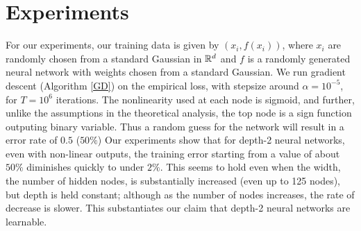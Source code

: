 

\section{Experiments}
\label{experiments}
For our experiments, our training data is given by $(x_i, f(x_i))$, where $x_i$ are randomly chosen from a standard Gaussian in ${\mathbb{R}}^d$ and $f$ is a randomly generated neural network with weights chosen from a standard Gaussian. We run gradient descent (Algorithm \ref{GD}) on the empirical loss, with stepsize around $\alpha = 10^{-5}$, for $T = 10^6$ iterations. The nonlinearity used at each node is sigmoid, and further, unlike the assumptions in the theoretical analysis, the top node is a sign function outputing binary variable. Thus a random guess for the network will result in a error rate of $0.5$ ($50\%$) Our experiments show that for depth-2 neural networks, even with non-linear outputs, the training error starting from a value of about $50\%$ diminishes quickly to under $2\%$. This seems to hold even when the width, the number of hidden nodes, is substantially increased (even up to 125 nodes), but depth is held constant; although as the number of nodes increases, the rate of decrease is slower. This substantiates our claim that depth-2 neural networks are learnable.

